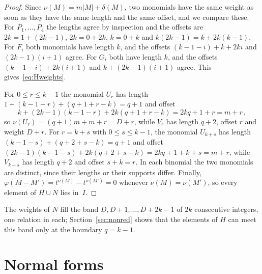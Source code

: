 \documentclass[11pt,letterpaper]{article}
\numberwithin{equation}{section}
\theoremstyle{plain}
\theoremstyle{remark}
\newcommand{\len}[1]{\lvert #1\rvert}
\begin{document}
\begin{proof}
Since $\nu(M)=m\len{M}+\delta(M)$, two monomials have the same weight as soon as they have the same length and the same offset, and we compare these. For $P_1,\dots,P_4$ the lengths agree by inspection and the offsets are $2k=1+(2k-1)$, $2k=0+2k$, $k=0+k$ and $k(2k-1)=k+2k(k-1)$. For $F_i$ both monomials have length $k$, and the offsets $(k-1-i)+k+2ki$ and $(2k-1)(i+1)$ agree. For $G_i$ both have length $k$, and the offsets $(k-1-i)+2k(i+1)$ and $k+(2k-1)(i+1)$ agree. This gives~\eqref{eq:Hweights}.

For $0\le r\le k-1$ the monomial $U_r$ has length $1+(k-1-r)+(q+1+r-k)=q+1$ and offset
\begin{equation*}
k+(2k-1)(k-1-r)+2k(q+1+r-k)=2kq+1+r=m+r\,,
\end{equation*}
so $\nu(U_r)=(q+1)m+m+r=D+r$, while $V_r$ has length $q+2$, offset $r$ and weight $D+r$. For $r=k+s$ with $0\le s\le k-1$, the monomial $U_{k+s}$ has length $(k-1-s)+(q+2+s-k)=q+1$ and offset $(2k-1)(k-1-s)+2k(q+2+s-k)=2kq+1+k+s=m+r$, while $V_{k+s}$ has length $q+2$ and offset $s+k=r$. In each binomial the two monomials are distinct, since their lengths or their supports differ. Finally, $\varphi(M-M')=t^{\nu(M)}-t^{\nu(M')}=0$ whenever $\nu(M)=\nu(M')$, so every element of $H\cup N$ lies in~$I$.
\end{proof}

The weights of $N$ fill the band $D,D+1,\dots,D+2k-1$ of $2k$ consecutive integers, one relation in each; Section~\ref{sec:nonred} shows that the elements of $H$ can meet this band only at the boundary $q=k-1$.

\section{Normal forms}\label{sec:normal}
\end{document}
